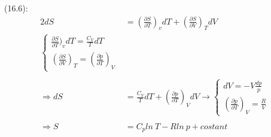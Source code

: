 \begin{latin}
    (16.6):\
    \begin{alignat*}{2}
        dS &= (\frac{\partial S}{\partial T})_v dT + (\frac{\partial S}{\partial V})_T dV\\
        \begin{cases}
            \frac{\partial S}{\partial T})_v dT =\frac{C_V}{T} dT\\
            (\frac{\partial S}{\partial V})_T = (\frac{\partial p}{\partial T})_V
        \end{cases}\\\\
        \Longrightarrow dS&= \frac{C_V}{T} dT + (\frac{\partial p}{\partial T})_V dV \to
        \begin{cases}
            dV = -V \frac{dp}{p}\\
            (\frac{\partial p}{\partial T})_V = \frac{R}{V}
        \end{cases}\\\\
        \Longrightarrow S &= C_p ln\ T - Rln\ p + costant
    \end{alignat*}

\end{latin}
